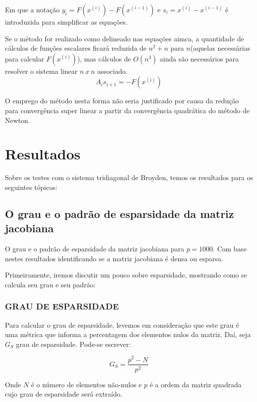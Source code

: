 \documentclass[
	12pt,				%
	oneside,			%
	a4paper,			%
	english,			%
	french,				%
	spanish,			%
	brazil				%
	]{abntex2}
\begin{document}
Em que a notação $y_i=F\left(x^{\left(i\right)}\right)-F\left(x^{\left(i-1\right)}\right)$ e $s_i=x^{\left(i\right)}-x^{\left(i-1\right)}$ é introduzida para simplificar as equações.

Se o método for realizado como delineado nas equações aimca, a quantidade de cálculos de funções escalares ficará reduzida de $n^2+n$ para $n$(aquelas necessárias para calcular $F\left(x^{\left(i\right)}\right)$), mas cálculos de $O\left(n^3\right)$ ainda são necessários para resolver o sistema linear $n\ x\ n$ associado.
$$A_is_{i+1}=-F\left(x^{(i)}\right)$$

O emprego do método nesta forma não seria justificado por causa da redução para convergência super linear a partir da convergência quadrática do método de Newton.

\newpage
\chapter{Resultados}
Sobre os testes com o sistema tridiagonal de Broyden, temos os resultados para os seguintes tópicos:
\section{O grau e o padrão de esparsidade da matriz jacobiana}

O grau e o padrão de esparsidade da matriz jacobiana para $p = 1000$. Com base nestes resultados identificando se a matriz jacobiana é densa ou esparsa.

Primeiramente, iremos discutir um pouco sobre esparsidade, mostrando como se calcula seu grau e seu padrão: 
 
\subsection{GRAU DE ESPARSIDADE} 
 
Para calcular o grau de esparsidade, levemos em consideração que este grau é uma métrica que informa a percentagem dos elementos nulos da matriz. Daí, seja $G_S$ grau de esparsidade. Pode-se escrever:

$$G_S = \dfrac{p^2-N}{p^2}$$
  
Onde $N$ é o número de elementos não-nulos e $p$ é a ordem da matriz quadrada cujo grau de esparsidade será extraído. 
\end{document}
